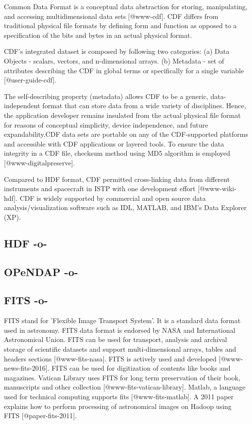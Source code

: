 Common Data Format is a conceptual data abstraction for storing,
manipulating, and accessing multidimensional data
sets [@www-cdf]. CDF differs from traditional physical file
formats by defining form and function as opposed to a specification of
the bits and bytes in an actual physical format.
 
CDF's integrated dataset is composed by following two categories:
(a) Data Objects - scalars, vectors, and n-dimensional
arrays. (b) Metadata - set of attributes describing the CDF in global
terms or specifically for a single variable [@user-guide-cdf].

The self-describing property (metadata) allows CDF to be a generic,
data-independent format that can store data from a wide variety of
disciplines. Hence, the application developer remains insulated from
the actual physical file format for reasons of conceptual simplicity,
device independence, and future expandability.CDF data sets are
portable on any of the CDF-supported platforms and accessible with CDF
applications or layered tools. To ensure the data integrity in a CDF
file, checksum method using MD5 algorithm is
employed [@www-digitalpreserve].

Compared to HDF format, CDF permitted cross-linking data from
different instruments and spacecraft in ISTP with one development
effort [@www-wiki-hdf].  CDF is widely supported by commercial and
open source data analysis/visualization software such as IDL, MATLAB,
and IBM's Data Explorer (XP).



\subsection{HDF -o-}



\subsection{OPeNDAP -o-}


\subsection{FITS -o-}

FITS stand for 'Flexible Image Transport System'. It is a standard
data format used in astronomy. FITS data format is endorsed by NASA
and International Astronomical Union. FITS can be used for transport,
analysis and archival storage of scientific datasets and support
multi-dimensional arrays, tables and headers
sections [@www-fits-nasa].  FITS is actively used and
developed [@www-news-fits-2016].  FITS can be used for
digitization of contents like books and magazines. Vatican Library
uses FITS for long term preservation of their book, manuscripts and
other collection [@www-fits-vatican-library]. Matlab, a language
used for technical computing supports fits [@www-fits-matlab]. A
2011 paper explains how to perform processing of astronomical images
on Hadoop using FITS [@paper-fits-2011].



